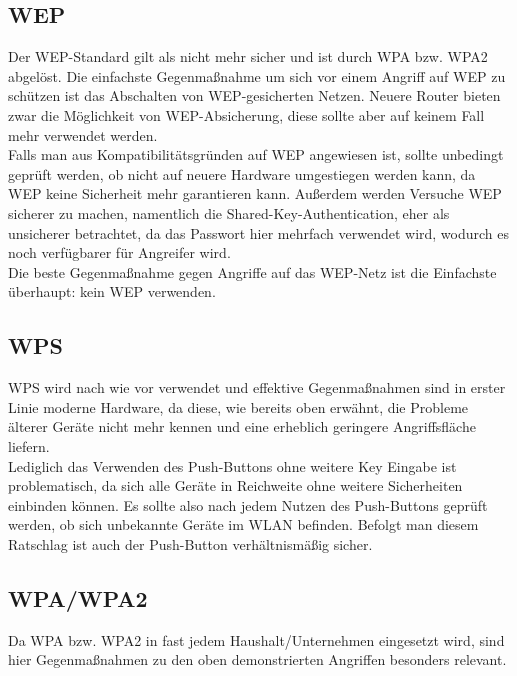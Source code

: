 \subsection{WEP}
Der WEP-Standard gilt als nicht mehr sicher und ist durch WPA bzw. WPA2 abgelöst. Die einfachste Gegenmaßnahme um sich vor einem Angriff auf WEP zu schützen ist das Abschalten von WEP-gesicherten Netzen. Neuere Router bieten zwar die Möglichkeit von WEP-Absicherung, diese sollte aber auf keinem Fall mehr verwendet werden. \\
Falls man aus Kompatibilitätsgründen auf WEP angewiesen ist, sollte unbedingt geprüft werden, ob nicht auf neuere Hardware umgestiegen werden kann, da WEP keine Sicherheit mehr garantieren kann. Außerdem werden Versuche WEP sicherer zu machen, namentlich die Shared-Key-Authentication, eher als unsicherer betrachtet, da das Passwort hier mehrfach verwendet wird, wodurch es noch verfügbarer für Angreifer wird. \\
Die beste Gegenmaßnahme gegen Angriffe auf das WEP-Netz ist die Einfachste überhaupt: kein WEP verwenden.

\subsection{WPS}
WPS wird nach wie vor verwendet und effektive Gegenmaßnahmen sind in erster Linie moderne Hardware, da diese, wie bereits oben erwähnt, die Probleme älterer Geräte nicht mehr kennen und eine erheblich geringere Angriffsfläche liefern. \\
Lediglich das Verwenden des Push-Buttons ohne weitere Key Eingabe ist problematisch, da sich alle Geräte in Reichweite ohne weitere Sicherheiten einbinden können. Es sollte also nach jedem Nutzen des Push-Buttons geprüft werden, ob sich unbekannte Geräte im WLAN befinden. Befolgt man diesem Ratschlag ist auch der Push-Button verhältnismäßig sicher.

\subsection{WPA/WPA2}
Da WPA bzw. WPA2 in fast jedem Haushalt/Unternehmen eingesetzt wird, sind hier Gegenmaßnahmen zu den oben demonstrierten Angriffen besonders relevant.

